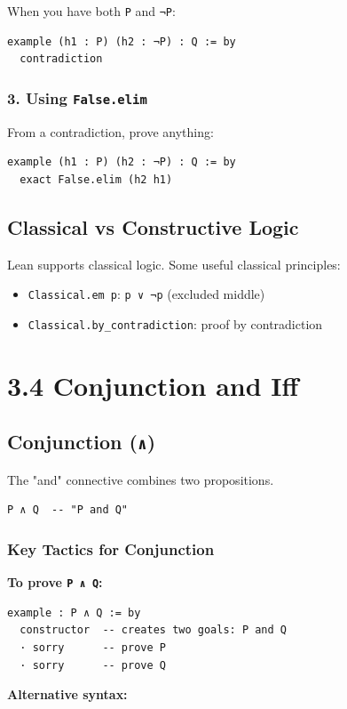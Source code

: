\documentclass{amsart}
\theoremstyle{plain}
\theoremstyle{definition}
\theoremstyle{remark}
\begin{document}
When you have both \lstinline{P} and \lstinline{¬P}:

\begin{lstlisting}[language=lean]
example (h1 : P) (h2 : ¬P) : Q := by
  contradiction
\end{lstlisting}
\subsubsection{3. Using \lstinline{False.elim}}

From a contradiction, prove anything:

\begin{lstlisting}[language=lean]
example (h1 : P) (h2 : ¬P) : Q := by
  exact False.elim (h2 h1)
\end{lstlisting}
\subsection{Classical vs Constructive Logic}

Lean supports classical logic. Some useful classical principles:

\begin{itemize}
	\item \lstinline{Classical.em p}: \lstinline{p ∨ ¬p} (excluded middle)
	\item \lstinline{Classical.by_contradiction}: proof by contradiction
\end{itemize}

\section{3.4 Conjunction and Iff}

\subsection{Conjunction (\lstinline{∧})}

The "and" connective combines two propositions.

\begin{lstlisting}[language=lean]
P ∧ Q  -- "P and Q"
\end{lstlisting}
\subsubsection{Key Tactics for Conjunction}

\textbf{To prove \lstinline{P ∧ Q}:}

\begin{lstlisting}[language=lean]
example : P ∧ Q := by
  constructor  -- creates two goals: P and Q
  · sorry      -- prove P
  · sorry      -- prove Q
\end{lstlisting}
\textbf{Alternative syntax:}
\end{document}
